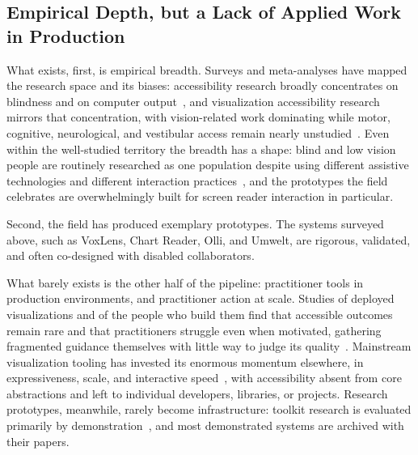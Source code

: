 \documentclass[12pt]{cmuthesis}
\begin{document}
\subsection{Empirical Depth, but a Lack of Applied Work in Production}
 
 
What exists, first, is empirical breadth. Surveys and meta-analyses have mapped the research space and its biases: accessibility research broadly concentrates on blindness and on computer output~\cite{Mack2021What}, and visualization accessibility research mirrors that concentration, with vision-related work dominating while motor, cognitive, neurological, and vestibular access remain nearly unstudied~\cite{Kim2021Accessible, Marriott, Wimer}. Even within the well-studied territory the breadth has a shape: blind and low vision people are routinely researched as one population despite using different assistive technologies and different interaction practices~\cite{szpiro_2016}, and the prototypes the field celebrates are overwhelmingly built for screen reader interaction in particular.

Second, the field has produced exemplary prototypes. The systems surveyed above, such as VoxLens, Chart Reader, Olli, and Umwelt, are rigorous, validated, and often co-designed with disabled collaborators.

 
What barely exists is the other half of the pipeline: practitioner tools in production environments, and practitioner action at scale. Studies of deployed visualizations and of the people who build them find that accessible outcomes remain rare and that practitioners struggle even when motivated, gathering fragmented guidance themselves with little way to judge its quality~\cite{Joyner2022Wild, Sharif2024Challenges}. Mainstream visualization tooling has invested its enormous momentum elsewhere, in expressiveness, scale, and interactive speed~\cite{Bostock2011D3, Satyanarayan2017VegaLite, heer_mosaic_2023}, with accessibility absent from core abstractions and left to individual developers, libraries, or projects. Research prototypes, meanwhile, rarely become infrastructure: toolkit research is evaluated primarily by demonstration~\cite{Ledo2018Evaluation}, and most demonstrated systems are archived with their papers.
\end{document}
